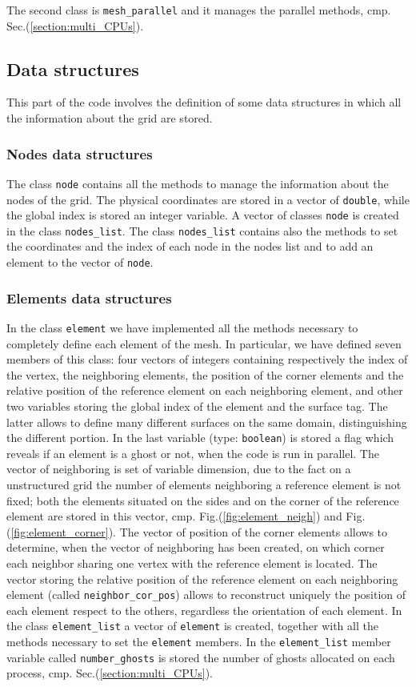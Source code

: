 The second class is \verb|mesh_parallel| and it manages the parallel methods, cmp. Sec.(\ref{section:multi_CPUs}).

\subsection{Data structures}\label{subsection:data_structures}
This part of the code involves the definition of some data structures in which all the information about the grid are stored.

\subsubsection{Nodes data structures}
The class \verb|node| contains all the methods to manage the information about the nodes of the grid. The physical coordinates are stored in a vector of \verb|double|, while the global index is stored an integer variable. A vector of classes \verb|node| is created in the class \verb|nodes_list|. The class \verb|nodes_list| contains also the methods to set the coordinates and the index of each node in the nodes list and to add an element to the vector of \verb|node|.

\subsubsection{Elements data structures}
In the class \verb|element| we have implemented all the methods necessary to completely define each element of the mesh. In particular, we have defined seven members of this class: four vectors of integers containing respectively the index of the vertex, the neighboring elements, the position of the corner elements and the relative position of the reference element on each neighboring element, and other two variables storing the global index of the element and the surface tag. The latter allows to define many different surfaces on the same domain, distinguishing the different portion. In the last variable (type: \verb|boolean|) is stored a flag which reveals if an element is a ghost or not, when the code is run in parallel. The vector of neighboring is set of variable dimension, due to the fact on a unstructured grid the number of elements neighboring a reference element is not fixed; both the elements situated on the sides and on the corner of the reference element are stored in this vector, cmp. Fig.(\ref{fig:element_neigh}) and Fig.(\ref{fig:element_corner}). The vector of position of the corner elements allows to determine, when the vector of neighboring has been created, on which corner each neighbor sharing one vertex with the reference element is located. The vector storing the relative position of the reference element on each neighboring element (called \verb|neighbor_cor_pos|) allows to reconstruct uniquely the position of each element respect to the others, regardless the orientation of each element. In the class \verb|element_list| a vector of \verb|element| is created, together with all the methods necessary to set the \verb|element| members. In the \verb|element_list| member variable called \verb|number_ghosts| is stored the number of ghosts allocated on each process, cmp. Sec.(\ref{section:multi_CPUs}).


